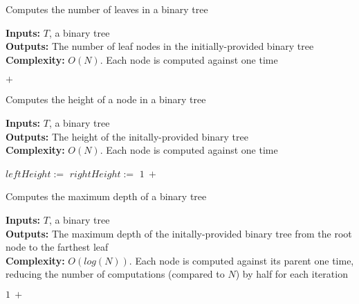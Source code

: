\begin{algorithm}[H]
\caption{Computes the number of leaves in a binary tree}
\textbf{Inputs:} $T$, a binary tree \\
\textbf{Outputs:} The number of leaf nodes in the initially-provided binary tree \\
\textbf{Complexity:} $O(N)$. Each node is computed against one time
\hline
\begin{algorithmic}[1]
      \State {}
      \State {}
    \Else
      \State \Return {} $+$  
    \EndIf
  \EndFunction
\end{algorithmic}
\end{algorithm}

\begin{algorithm}[H]
\caption{Computes the height of a node in a binary tree}
\textbf{Inputs:} $T$, a binary tree \\
\textbf{Outputs:} The height of the initally-provided binary tree \\
\textbf{Complexity:} $O(N)$. Each node is computed against one time
\hline
\begin{algorithmic}[1]
      \State {}
    \EndIf
    \State $leftHeight :=$ 
    \State $rightHeight :=$ 
    \State \Return $1\ +$ 
  \EndFunction
\end{algorithmic}
\end{algorithm}

\begin{algorithm}[H]
\caption{Computes the maximum depth of a binary tree}
\textbf{Inputs:} $T$, a binary tree \\
\textbf{Outputs:} The maximum depth of the initally-provided binary tree from the root node to the farthest leaf \\
\textbf{Complexity:} $O(log(N))$. Each node is computed against its parent one time, reducing the number of computations (compared to $N$) by half for each iteration
\hline
\begin{algorithmic}[1]
      \State {}
    \Else
      \State \Return $1\ +$ 
    \EndIf
  \EndFunction
\end{algorithmic}
\end{algorithm}

